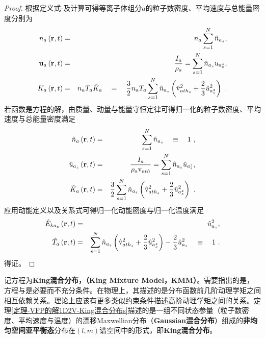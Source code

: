  \begin{proof}
      根据定义式-及计算可得等离子体组分$a$的粒子数密度、平均速度与总能量密度分别为
      \begin{eqnarray}
        n_a \left(\mathbf{r},t \right) &=& n_a \sum_{s=1}^{N} \hat{n}_{a_s} , \label{nasAxis}
        \\
        \mathbf{u}_a \left(\mathbf{r},t \right) &=& \frac{I_a}{\rho_a} = \sum_{s=1}^{N} \hat{n}_{a_s} u_{a_z^s} , \label{uasAxis}
        \\
        K_a \left(\mathbf{r},t \right) &=&  n_a T_a \hat{K}_a \quad = \quad  \frac{3}{2} n_a T_a \sum_{s=1}^{N} \hat{n}_{a_s} \left(\hat{\mathrm{v}}_{{ath}_s}^2 + \frac{2}{3} {\hat{u}}_{a_s^z}^2 \right) ~. \label{KasAxis}
      \end{eqnarray}
      若函数是方程的解，由质量、动量与能量守恒定律可得归一化的粒子数密度、平均速度与总能量密度满足
      \begin{eqnarray}
        \hat{n}_a \left(\mathbf{r},t \right) &=& \sum_{s=1}^{N} \hat{n}_{a_s} \quad \equiv \quad 1 ~, \label{nhasAxis}
        \\
        {\hat{u}}_{a_z} \left(\mathbf{r},t \right) &=& \frac{I_a}{\rho_a \mathrm{v}_{ath}} = \sum_{s=1}^{N} \hat{n}_{a_s} {\hat{u}}_{a_s^z} , \label{uhazsAxis}
        \\
        \hat{K}_a \left(\mathbf{r},t \right) & = & \frac{3}{2} \sum_{s=1}^{N} \hat{n}_{a_s} \left(\hat{\mathrm{v}}_{{ath}_s}^2 + \frac{2}{3} {\hat{u}}_{a_s^z}^2 \right) ~. \label{KhasAxis}
      \end{eqnarray}
      应用动能定义以及关系式可得归一化动能密度与归一化温度满足
      \begin{eqnarray}
        {\hat{E}}_{{ka}_z} \left(\mathbf{r},t \right) &=& {\hat{u}}_{a_z}^2, \label{EhkaAxis}
        \\
        \hat{T}_a \left(\mathbf{r},t \right) &=& \sum_{s=1}^{N} \hat{n}_{a_s} \left(\hat{\mathrm{v}}_{{ath}_s}^2 + \frac{2}{3} {\hat{u}}_{a_s^z}^2 \right) - \frac{2}{3}  {\hat{u}}_{a_z}^2  \quad \equiv \quad 1 ~ . \label{ThasAxis}
      \end{eqnarray}
      得证。
  \end{proof}
  记方程为\textbf{King混合分布，（King Mixture Model，KMM）}。需要指出的是，方程与是必要而不充分条件。在物理上，其描述的是分布函数前几阶动理学矩之间相互依赖关系。理论上应该有更多类似约束条件描述高阶动理学矩之间的关系。定理\ref{定理-VFP的解1D2V-King混合分布s}描述的是一组不同状态参量（粒子数密度、平均速度与温度）的漂移Maxwellian分布（\textbf{Gaussian混合分布}）组成的\textbf{非均匀空间亚平衡态}分布在$(l,m)$谱空间中的形式，即\textbf{King混合分布}。
  
